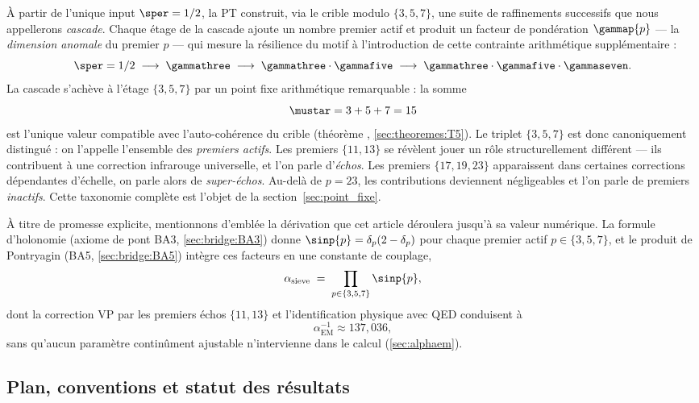 À partir de l'unique input $\sper = 1/2$, la PT construit, via le crible modulo $\{3, 5, 7\}$, une suite de raffinements successifs que nous appellerons \emph{cascade}. Chaque étage de la cascade ajoute un nombre premier actif et produit un facteur de pondération $\gammap{p}$ --- la \emph{dimension anomale} du premier $p$ --- qui mesure la résilience du motif à l'introduction de cette contrainte arithmétique supplémentaire :
\[
\sper = 1/2 \;\longrightarrow\; \gammathree \;\longrightarrow\; \gammathree\cdot\gammafive \;\longrightarrow\; \gammathree\cdot\gammafive\cdot\gammaseven.
\]
La cascade s'achève à l'étage $\{3,5,7\}$ par un point fixe arithmétique remarquable : la somme
\[
\mustar = 3 + 5 + 7 = 15
\]
est l'unique valeur compatible avec l'auto-cohérence du crible (théorème \Tfive{}, \ref{sec:theoremes:T5}). Le triplet $\{3, 5, 7\}$ est donc canoniquement distingué : on l'appelle l'ensemble des \emph{premiers actifs}. Les premiers $\{11, 13\}$ se révèlent jouer un rôle structurellement différent --- ils contribuent à une correction infrarouge universelle, et l'on parle d'\emph{échos}. Les premiers $\{17, 19, 23\}$ apparaissent dans certaines corrections dépendantes d'échelle, on parle alors de \emph{super-échos}. Au-delà de $p = 23$, les contributions deviennent négligeables et l'on parle de premiers \emph{inactifs}. Cette taxonomie complète est l'objet de la section~\ref{sec:point_fixe}.

À titre de promesse explicite, mentionnons d'emblée la dérivation que cet article déroulera jusqu'à sa valeur numérique. La formule d'holonomie (axiome de pont BA3, \ref{sec:bridge:BA3}) donne $\sinp{p} = \delta_p(2 - \delta_p)$ pour chaque premier actif $p \in \{3,5,7\}$, et le produit de Pontryagin (BA5, \ref{sec:bridge:BA5}) intègre ces facteurs en une constante de couplage,
\[
\alpha_{\rm sieve} \;=\; \prod_{p\in\{3,5,7\}} \sinp{p},
\]
dont la correction VP par les premiers échos $\{11,13\}$ et l'identification physique avec QED conduisent à
\[
\alpha_{\mathrm{EM}}^{-1} \approx 137{,}036,
\]
sans qu'aucun paramètre continûment ajustable n'intervienne dans le calcul (\ref{sec:alphaem}).

\subsection{Plan, conventions et statut des résultats}
\label{sec:intro:plan}

